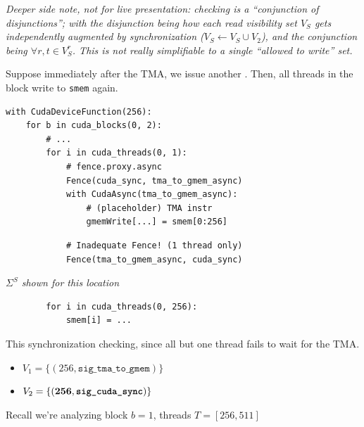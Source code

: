 \hfill
\begin{minipage}[t]{0.7\textwidth}\fixminipage
\vspace{6mm}
\textit{Deeper side note, not for live presentation:  checking is a ``conjunction of disjunctions''; with the disjunction being how each read visibility set $V_S$ gets independently augmented by synchronization ($V_S \leftarrow V_S \cup V_2$), and the conjunction being $\forall r, t \in V_S^r$.
This is not really simplifiable to a single ``allowed to write'' set.}
\end{minipage}
\newpage
\begin{minipage}[t]{0.55\textwidth}\fixminipage
\vspace{-6mm}

Suppose immediately after the TMA, we issue another .
Then, all threads in the block write to \texttt{smem} again.

\begin{verbatim}
with CudaDeviceFunction(256):
    for b in cuda_blocks(0, 2):
        # ...
        for i in cuda_threads(0, 1):
            # fence.proxy.async
            Fence(cuda_sync, tma_to_gmem_async)
            with CudaAsync(tma_to_gmem_async):
                # (placeholder) TMA instr
                gmemWrite[...] = smem[0:256]
\end{verbatim}
\begin{mdframed}[style=MyFrame, backgroundcolor=violetBoxBg]
\color{violetBoxFg}
\begin{verbatim}
            # Inadequate Fence! (1 thread only)
            Fence(tma_to_gmem_async, cuda_sync)
\end{verbatim}
\end{mdframed}
\hfill\textit{$\Sigma^S$ shown for this location}
\vspace{2mm}
\begin{mdframed}[style=MyFrame, backgroundcolor=greenBoxBg]
\color{greenBoxFg}
\begin{verbatim}
        for i in cuda_threads(0, 256):
            smem[i] = ...
\end{verbatim}
\end{mdframed}

This  synchronization checking, since all but one thread fails to wait for the TMA.

\begin{itemize}
  \item $V_1 = \{(256, \texttt{sig\_tma\_to\_gmem})\}$
  \item $V_2 = \{(\mathbf{256}, \textbf{\texttt{sig\_cuda\_sync}})\}$
\end{itemize}
Recall we're analyzing block $b=1$, threads $T = [256, 511]$

\end{minipage}

